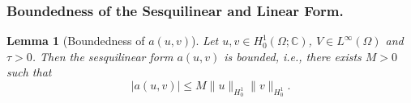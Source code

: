 \documentclass{article}
\theoremstyle{definition}
\theoremstyle{plain}
\newtheorem{lemma}[definition]{Lemma}
\theoremstyle{remark}
\begin{document}

\subsubsection*{Boundedness of the Sesquilinear and Linear Form.}

\begin{lemma}[Boundedness of $a(u, v)$]
Let $u, v \in H_0^1(\Omega; \mathbb{C})$, $V \in L^\infty(\Omega)$ and $\tau > 0$. Then the sesquilinear form $a(u, v)$ is bounded, i.e., there exists $M > 0$ such that
\[
|a(u, v)| \leq M \|u\|_{H_0^1} \|v\|_{H_0^1}.
\]
\end{lemma}
\end{document}
